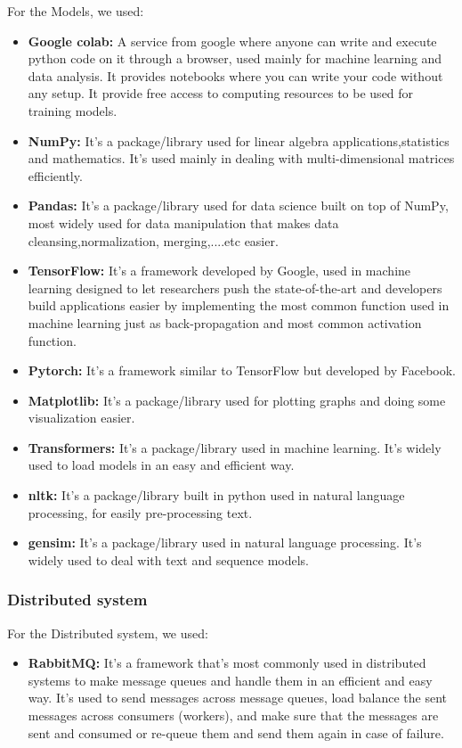 For the Models, we used:
\begin{itemize}
    \item \textbf{Google colab: }A service from google where anyone can write and execute python code on it through a browser, used mainly for machine learning and data analysis. It provides notebooks where you can write your code without any setup. It provide free access to computing resources to be used for training models.
    \item \textbf{NumPy: }It’s a package/library used for linear algebra applications,statistics and mathematics. It’s used mainly in dealing with multi-dimensional matrices efficiently.
    \item \textbf{Pandas: }It’s a package/library used for data science built on top of NumPy, most widely used for data manipulation that makes data cleansing,normalization, merging,....etc easier.
    \item \textbf{TensorFlow: }It’s a framework developed by Google, used in machine learning designed to let researchers push the state-of-the-art and developers build applications easier by implementing the most common function used in machine learning just as back-propagation and most common activation function.
    \item \textbf{Pytorch: }It’s a framework similar to TensorFlow but developed by Facebook.
    
    \item \textbf{Matplotlib: }It’s a package/library used for plotting graphs and doing some visualization easier.
    
    \item \textbf{Transformers: }It’s a package/library used in machine learning. It’s widely used to load models in an easy and efficient way.
    
    \item \textbf{nltk: }It’s a package/library built in python used in natural language processing, for easily pre-processing text.
    
    \item \textbf{gensim: }It’s a package/library used in natural language processing. It’s widely used to deal with text and sequence models.
    
    
\end{itemize}


\subsubsection{Distributed system}
For the Distributed system, we used: 

\begin{itemize}
    \item \textbf{RabbitMQ: }It’s a framework that’s most commonly used in distributed systems to make message queues and handle them in an efficient and easy way. It's used to send messages across message queues, load balance the sent messages across consumers (workers), and make sure that the messages are sent and consumed or re-queue them and send them again in case of failure.
\end{itemize}